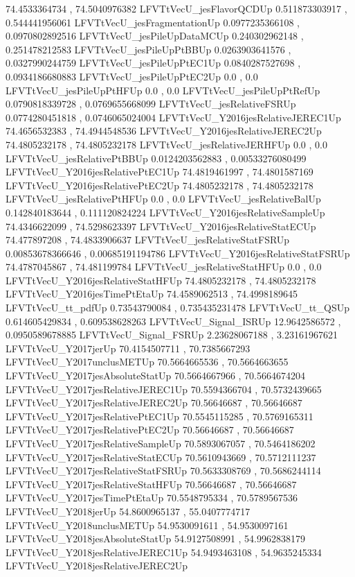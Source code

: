 74.4533364734 , 74.5040976382
LFVTtVecU_jesFlavorQCDUp
0.511873303917 , 0.544441956061
LFVTtVecU_jesFragmentationUp
0.0977235366108 , 0.0970802892516
LFVTtVecU_jesPileUpDataMCUp
0.240302962148 , 0.251478212583
LFVTtVecU_jesPileUpPtBBUp
0.0263903641576 , 0.0327990244759
LFVTtVecU_jesPileUpPtEC1Up
0.0840287527698 , 0.0934186680883
LFVTtVecU_jesPileUpPtEC2Up
0.0 , 0.0
LFVTtVecU_jesPileUpPtHFUp
0.0 , 0.0
LFVTtVecU_jesPileUpPtRefUp
0.0790818339728 , 0.0769655668099
LFVTtVecU_jesRelativeFSRUp
0.0774280451818 , 0.0746065024004
LFVTtVecU_Y2016jesRelativeJEREC1Up
74.4656532383 , 74.4944548536
LFVTtVecU_Y2016jesRelativeJEREC2Up
74.4805232178 , 74.4805232178
LFVTtVecU_jesRelativeJERHFUp
0.0 , 0.0
LFVTtVecU_jesRelativePtBBUp
0.0124203562883 , 0.00533276080499
LFVTtVecU_Y2016jesRelativePtEC1Up
74.4819461997 , 74.4801587169
LFVTtVecU_Y2016jesRelativePtEC2Up
74.4805232178 , 74.4805232178
LFVTtVecU_jesRelativePtHFUp
0.0 , 0.0
LFVTtVecU_jesRelativeBalUp
0.142840183644 , 0.111120824224
LFVTtVecU_Y2016jesRelativeSampleUp
74.4346622099 , 74.5298623397
LFVTtVecU_Y2016jesRelativeStatECUp
74.477897208 , 74.4833906637
LFVTtVecU_jesRelativeStatFSRUp
0.00853678366646 , 0.00685191194786
LFVTtVecU_Y2016jesRelativeStatFSRUp
74.4787045867 , 74.481199784
LFVTtVecU_jesRelativeStatHFUp
0.0 , 0.0
LFVTtVecU_Y2016jesRelativeStatHFUp
74.4805232178 , 74.4805232178
LFVTtVecU_Y2016jesTimePtEtaUp
74.4589062513 , 74.4998189645
LFVTtVecU_tt_pdfUp
0.73543790084 , 0.735435231478
LFVTtVecU_tt_QSUp
0.614605429834 , 0.609538628263
LFVTtVecU_Signal_ISRUp
12.9642586572 , 0.0950589678885
LFVTtVecU_Signal_FSRUp
2.23628067188 , 3.23161967621
LFVTtVecU_Y2017jerUp
70.4154507711 , 70.7385667293
LFVTtVecU_Y2017unclusMETUp
70.5664665536 , 70.5664663655
LFVTtVecU_Y2017jesAbsoluteStatUp
70.5664667966 , 70.5664674204
LFVTtVecU_Y2017jesRelativeJEREC1Up
70.5594366704 , 70.5732439665
LFVTtVecU_Y2017jesRelativeJEREC2Up
70.56646687 , 70.56646687
LFVTtVecU_Y2017jesRelativePtEC1Up
70.5545115285 , 70.5769165311
LFVTtVecU_Y2017jesRelativePtEC2Up
70.56646687 , 70.56646687
LFVTtVecU_Y2017jesRelativeSampleUp
70.5893067057 , 70.5464186202
LFVTtVecU_Y2017jesRelativeStatECUp
70.5610943669 , 70.5712111237
LFVTtVecU_Y2017jesRelativeStatFSRUp
70.5633308769 , 70.5686244114
LFVTtVecU_Y2017jesRelativeStatHFUp
70.56646687 , 70.56646687
LFVTtVecU_Y2017jesTimePtEtaUp
70.5548795334 , 70.5789567536
LFVTtVecU_Y2018jerUp
54.8600965137 , 55.0407774717
LFVTtVecU_Y2018unclusMETUp
54.9530091611 , 54.9530097161
LFVTtVecU_Y2018jesAbsoluteStatUp
54.9127508991 , 54.9962838179
LFVTtVecU_Y2018jesRelativeJEREC1Up
54.9493463108 , 54.9635245334
LFVTtVecU_Y2018jesRelativeJEREC2Up
